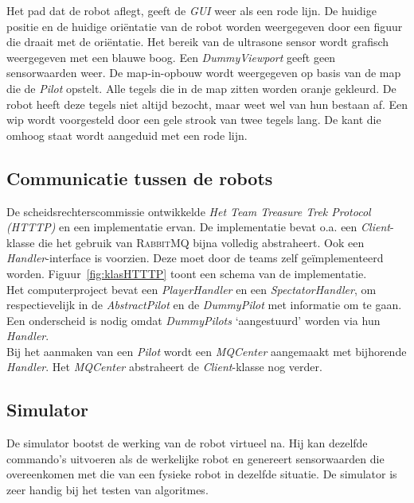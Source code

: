 \documentclass[eind]{penoverslag}
\begin{document}
Het pad dat de robot aflegt, geeft de \textit{GUI} weer als een rode lijn. De huidige positie en de huidige ori\"entatie van de robot worden weergegeven door een figuur die draait met de ori\"entatie. Het bereik van de ultrasone sensor wordt grafisch weergegeven met een blauwe boog. Een \textit{DummyViewport} geeft geen sensorwaarden weer. De map-in-opbouw wordt weergegeven op basis van de map die de \textit{Pilot} opstelt. Alle tegels die in de map zitten worden oranje gekleurd. De robot heeft deze tegels niet altijd bezocht, maar weet wel van hun bestaan af. Een wip wordt voorgesteld door een gele strook van twee tegels lang. De kant die omhoog staat wordt aangeduid met een rode lijn.

\subsection{Communicatie tussen de robots}
\label{ssec:RabbMQ}



De scheidsrechterscommissie ontwikkelde \textit{Het Team Treasure Trek Protocol (HTTTP)} en een implementatie ervan. De implementatie bevat o.a. een \textit{Client}-klasse die het gebruik van \textsc{RabbitMQ} bijna volledig abstraheert. Ook een \textit{Handler}-interface is voorzien. Deze moet door de teams zelf ge\"implementeerd worden. Figuur~\ref{fig:klasHTTTP} toont een schema van de implementatie.\\

Het computerproject bevat een \textit{PlayerHandler} en een \textit{SpectatorHandler}, om respectievelijk in de \textit{AbstractPilot} en de \textit{DummyPilot} met informatie om te gaan. Een onderscheid is nodig omdat \textit{DummyPilots} `aangestuurd' worden via hun \textit{Handler}.\\

Bij het aanmaken van een \textit{Pilot} wordt een \textit{MQCenter} aangemaakt met bijhorende \textit{Handler}. Het \textit{MQCenter} abstraheert de \textit{Client}-klasse nog verder.

\subsection{Simulator} 
\label{ssec:Sim}
De simulator bootst de werking van de robot virtueel na.
Hij kan dezelfde commando's uitvoeren als de werkelijke robot en
genereert sensorwaarden die overeenkomen met die van een fysieke
robot in dezelfde situatie. De simulator is zeer handig bij het testen van algoritmes.
\end{document}
